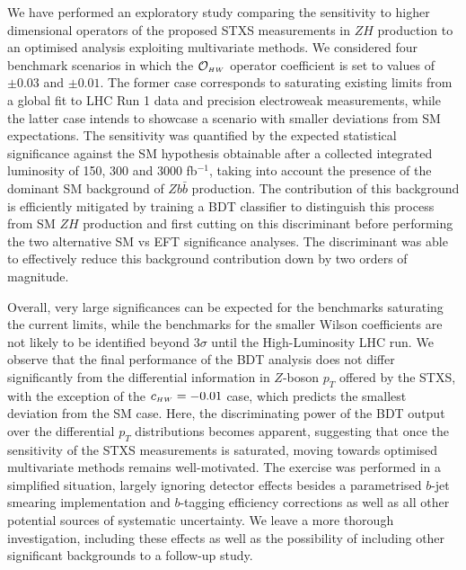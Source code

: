 We have performed an exploratory study comparing the sensitivity to higher dimensional operators of the proposed STXS measurements in $ZH$ production to an optimised analysis exploiting multivariate methods. We considered four benchmark scenarios in which the $\mathcal{O}_{\scriptscriptstyle HW}$ operator coefficient is set to values of $\pm 0.03$ and $\pm 0.01$. The former case corresponds to saturating existing limits from a global fit to LHC Run 1 data and precision electroweak measurements, while the latter case intends to showcase a scenario with smaller deviations from SM expectations. The sensitivity was quantified by the expected statistical significance against the SM hypothesis obtainable after a collected integrated luminosity of 150, 300 and 3000 fb$^{-1}$, taking into account the presence of the dominant SM background of $Zb\bar{b}$ production. The contribution of this background is efficiently mitigated by training a BDT classifier to distinguish this process from SM $ZH$ production and first cutting on this discriminant before performing the two alternative SM vs EFT significance analyses. The discriminant was able to effectively reduce this background contribution down by two orders of magnitude.

Overall, very large significances can be expected for the benchmarks saturating the current limits, while the benchmarks for the smaller Wilson coefficients are not likely to be identified beyond 3$\sigma$ until the High-Luminosity LHC run. We observe that the final performance of the BDT analysis does not differ significantly from the differential information in $Z$-boson $p_T$ offered by the STXS, with the exception of the $c_{\scriptscriptstyle HW}=-0.01$ case, which predicts the smallest deviation from the SM case. Here, the discriminating power of the BDT output over the differential $p_T$ distributions becomes apparent, suggesting that once the sensitivity of the STXS measurements is saturated, moving towards optimised multivariate methods remains well-motivated. The exercise was performed in a simplified situation, largely ignoring detector effects besides a parametrised $b$-jet smearing implementation and $b$-tagging efficiency corrections as well as all other potential sources of systematic uncertainty. We leave a more thorough investigation, including these effects as well as the possibility of including other significant backgrounds to a follow-up study. 

